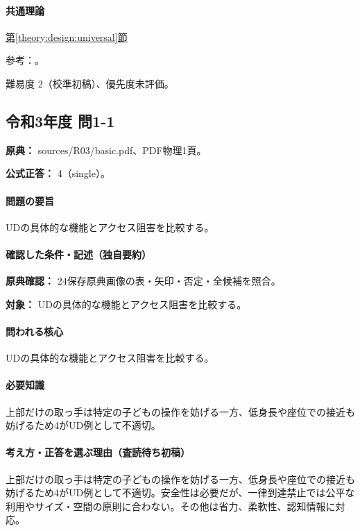 \paragraph{共通理論} \hyperref[theory:design:universal]{第\ref*{theory:design:universal}節}

\par 参考：\cite{design48_ud}。

\par 難易度 2（校準初稿）、優先度未評価。

\subsection{令和3年度 問1-1}
\label{q:r03-reg-basic-1-1}

\noindent\textbf{原典：} sources/R03/basic.pdf、PDF物理1頁。

\textbf{公式正答：} 4（single）。

\paragraph{問題の要旨} UDの具体的な機能とアクセス阻害を比較する。

\paragraph{確認した条件・記述（独自要約）}\mbox{}\par

\noindent\textbf{原典確認：} 24保存原典画像の表・矢印・否定・全候補を照合。\par

\noindent\textbf{対象：} UDの具体的な機能とアクセス阻害を比較する。\par

\paragraph{問われる核心} UDの具体的な機能とアクセス阻害を比較する。

\paragraph{必要知識} 上部だけの取っ手は特定の子どもの操作を妨げる一方、低身長や座位での接近も妨げるため4がUD例として不適切。

\paragraph{考え方・正答を選ぶ理由（査読待ち初稿）} 上部だけの取っ手は特定の子どもの操作を妨げる一方、低身長や座位での接近も妨げるため4がUD例として不適切。安全性は必要だが、一律到達禁止では公平な利用やサイズ・空間の原則に合わない。その他は省力、柔軟性、認知情報に対応。

